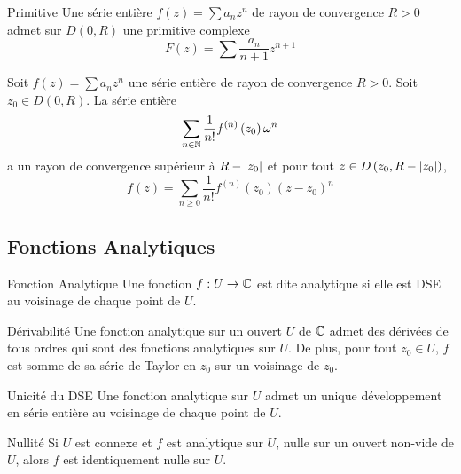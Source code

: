 \documentclass{cours}
\begin{document}
\begin{corollaire}{Primitive}{}
    Une série entière $f\left(z\right) = \sum a_{n}z^{n}$ de rayon de convergence $R > 0$ admet sur $D\left(0, R\right)$ une primitive complexe
    \begin{equation*}
        F\left(z\right) = \sum \frac{a_{n}}{n + 1}z^{n + 1}
    \end{equation*}
\end{corollaire}

\begin{propositionfr}
    Soit $f\left(z\right) = \sum a_{n}z^{n}$ une série entière de rayon de convergence $R > 0$. Soit $z_{0} \in D\left(0, R\right)$. La série entière 
    \begin{equation*}
        \sum_{n \in \mathbb{N}}\frac{1}{n!}f^{\left(n\right)}\left(z_{0}\right)\omega^{n}
    \end{equation*}
    a un rayon de convergence supérieur à $R - \left|z_{0}\right|$ et pour tout $z \in D\left(z_{0}, R - \left|z_{0}\right|\right)$,
    \begin{equation*}
        f\left(z\right) = \sum_{n \geq 0} \frac{1}{n !}f^{\left(n\right)}\left(z_{0}\right)\left(z - z_{0}\right)^{n}
    \end{equation*}
\end{propositionfr}

\subsection{Fonctions Analytiques}
\begin{définition}{Fonction Analytique}{}
    Une fonction $f : U \to \mathbb{C}$ est dite analytique si elle est DSE au voisinage de chaque point de $U$. 
\end{définition}

\begin{propositionfr}{Dérivabilité}{}
    Une fonction analytique sur un ouvert $U$ de $\mathbb{C}$ admet des dérivées de tous ordres qui sont des fonctions analytiques sur $U$. De plus, pour tout $z_{0} \in U$, $f$ est somme de sa série de Taylor en $z_{0}$ sur un voisinage de $z_{0}$.
\end{propositionfr}

\begin{corollaire}{Unicité du DSE}{}
    Une fonction analytique sur $U$ admet un unique développement en série entière au voisinage de chaque point de $U$.
\end{corollaire}

\begin{lemme}{Nullité}{}
    Si $U$ est connexe et $f$ est analytique sur $U$, nulle sur un ouvert non-vide de $U$, alors $f$ est identiquement nulle sur $U$. 
\end{lemme}
\end{document}
